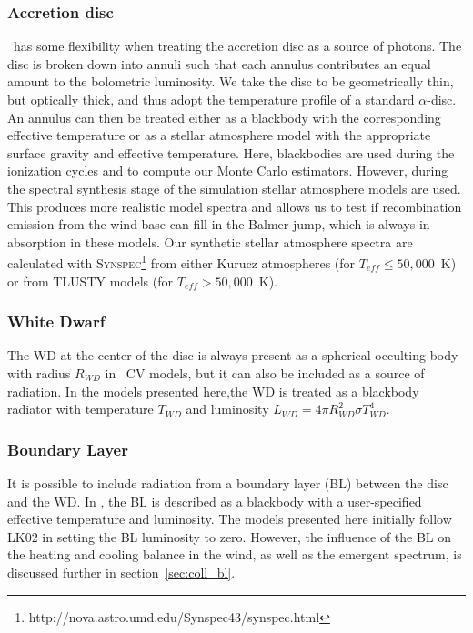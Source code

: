 \subsubsection{Accretion disc}

\py\ has some flexibility when treating the accretion 
disc as a source of photons. The disc is broken down into annuli 
such that each annulus contributes an equal amount to the bolometric
luminosity. We take the disc to be geometrically thin, but optically
thick, and thus adopt the temperature profile of a standard
\cite{shakurasunyaev1973} $\alpha$-disc. An annulus can then
be treated either as a blackbody with the corresponding effective
temperature or as a stellar atmosphere model with the appropriate
surface gravity and effective temperature. Here, blackbodies are used
during the ionization cycles and to compute our Monte Carlo
estimators. However, during the spectral synthesis stage of the 
simulation stellar atmosphere models are used. This produces more
realistic model spectra and allows us to test if recombination
emission from the wind base can fill in the Balmer jump, which is
always in absorption in these models. Our synthetic stellar atmosphere
spectra are calculated with
\textsc{Synspec}\footnote{http://nova.astro.umd.edu/Synspec43/synspec.html}
from either Kurucz \citep{kurucz1991} atmospheres (for $T_{eff} \leq
50,000$~K) or from \textsc{TLUSTY} \citep{tlusty} models (for $T_{eff} > 50,000$~K). 

\subsubsection{White Dwarf}

The WD at the center of the disc is always present as a spherical occulting
body with radius $R_{WD}$ in \py\ CV models, but it can also be included
as a source of radiation. In the models presented here,the
WD is treated as a blackbody radiator with temperature $T_{WD}$ and luminosity
$L_{WD} = 4\pi R_{WD}^2 \sigma T_{WD}^4$. 

\subsubsection{Boundary Layer}

It is possible to include radiation from a boundary layer (BL) between
the disc and the WD. In \py, the BL is described as
a blackbody with a user-specified effective temperature and
luminosity. The models presented here initially follow LK02 in setting
the BL luminosity to zero. However, the influence of the BL on 
the heating and cooling balance
in the wind, as well as the emergent spectrum, is discussed
further in section~\ref{sec:coll_bl}.

